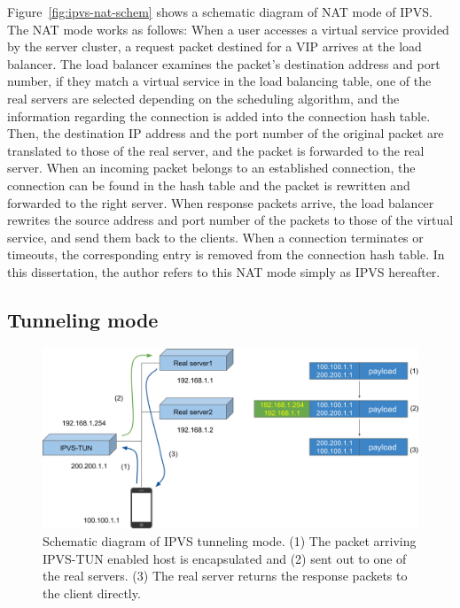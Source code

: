 Figure~\ref{fig:ipvs-nat-schem} shows a schematic diagram of NAT mode of IPVS.
The NAT mode works as follows: When a user accesses a virtual service provided by the server cluster, a request packet destined for a VIP arrives at the load balancer.
The load balancer examines the packet's destination address and port number, if they match a virtual service in the load balancing table, one of the real servers are selected depending on the scheduling algorithm, and the information regarding the connection is added into the connection hash table.
Then, the destination IP address and the port number of the original packet are translated to those of the real server, and the packet is forwarded to the real server.
When an incoming packet belongs to an established connection, the connection can be found in the hash table and the packet is rewritten and forwarded to the right server.
When response packets arrive, the load balancer rewrites the source address and port number of the packets to those of the virtual service, and send them back to the clients.
When a connection terminates or timeouts, the corresponding entry is removed from the connection hash table.
%
In this dissertation, the author refers to this NAT mode simply as IPVS hereafter.

\FloatBarrier

\subsection{Tunneling mode}

\begin{figure}[h]
  \centering
  \includegraphics[width=0.95\columnwidth]{Figs/ipvs-tun-schem}

  \par\bigskip
  \centering
  \begin{minipage}{0.9\columnwidth}
    \caption[IPVS tunneling  mode]{
    Schematic diagram of IPVS tunneling mode.
    (1) The packet arriving IPVS-TUN enabled host is encapsulated and (2) sent out to one of the real servers.
    (3) The real server returns the response packets to the client directly. 
    }
    \label{fig:ipvs-tun-schem}
  \end{minipage}
\end{figure}

